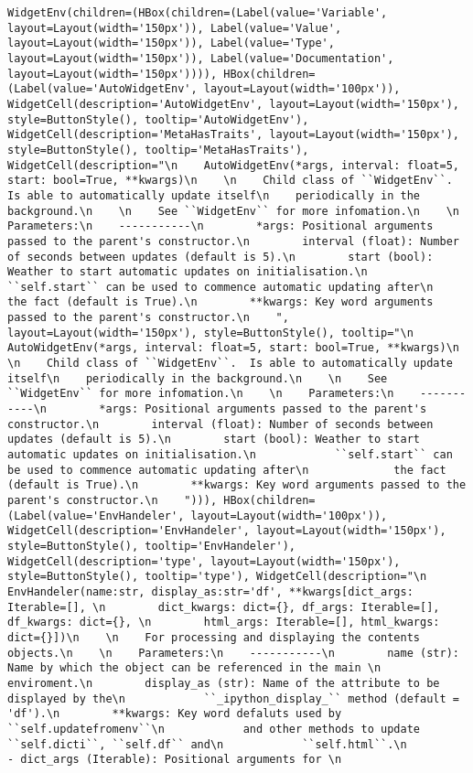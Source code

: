 \documentclass[11pt]{article}
\begin{document}
    
    
    \begin{verbatim}
WidgetEnv(children=(HBox(children=(Label(value='Variable', layout=Layout(width='150px')), Label(value='Value', layout=Layout(width='150px')), Label(value='Type', layout=Layout(width='150px')), Label(value='Documentation', layout=Layout(width='150px')))), HBox(children=(Label(value='AutoWidgetEnv', layout=Layout(width='100px')), WidgetCell(description='AutoWidgetEnv', layout=Layout(width='150px'), style=ButtonStyle(), tooltip='AutoWidgetEnv'), WidgetCell(description='MetaHasTraits', layout=Layout(width='150px'), style=ButtonStyle(), tooltip='MetaHasTraits'), WidgetCell(description="\n    AutoWidgetEnv(*args, interval: float=5, start: bool=True, **kwargs)\n    \n    Child class of ``WidgetEnv``.  Is able to automatically update itself\n    periodically in the background.\n    \n    See ``WidgetEnv`` for more infomation.\n    \n    Parameters:\n    -----------\n        *args: Positional arguments passed to the parent's constructor.\n        interval (float): Number of seconds between updates (default is 5).\n        start (bool): Weather to start automatic updates on initialisation.\n            ``self.start`` can be used to commence automatic updating after\n             the fact (default is True).\n        **kwargs: Key word arguments passed to the parent's constructor.\n    ", layout=Layout(width='150px'), style=ButtonStyle(), tooltip="\n    AutoWidgetEnv(*args, interval: float=5, start: bool=True, **kwargs)\n    \n    Child class of ``WidgetEnv``.  Is able to automatically update itself\n    periodically in the background.\n    \n    See ``WidgetEnv`` for more infomation.\n    \n    Parameters:\n    -----------\n        *args: Positional arguments passed to the parent's constructor.\n        interval (float): Number of seconds between updates (default is 5).\n        start (bool): Weather to start automatic updates on initialisation.\n            ``self.start`` can be used to commence automatic updating after\n             the fact (default is True).\n        **kwargs: Key word arguments passed to the parent's constructor.\n    "))), HBox(children=(Label(value='EnvHandeler', layout=Layout(width='100px')), WidgetCell(description='EnvHandeler', layout=Layout(width='150px'), style=ButtonStyle(), tooltip='EnvHandeler'), WidgetCell(description='type', layout=Layout(width='150px'), style=ButtonStyle(), tooltip='type'), WidgetCell(description="\n    EnvHandeler(name:str, display_as:str='df', **kwargs[dict_args: Iterable=[], \n        dict_kwargs: dict={}, df_args: Iterable=[], df_kwargs: dict={}, \n        html_args: Iterable=[], html_kwargs: dict={}])\n    \n    For processing and displaying the contents objects.\n    \n    Parameters:\n    -----------\n        name (str): Name by which the object can be referenced in the main \n            enviroment.\n        display_as (str): Name of the attribute to be displayed by the\n            ``_ipython_display_`` method (default = 'df').\n        **kwargs: Key word defaluts used by ``self.updatefromenv``\n            and other methods to update ``self.dicti``, ``self.df`` and\n            ``self.html``.\n                - dict_args (Iterable): Positional arguments for \n          
\end{verbatim}
\end{document}

